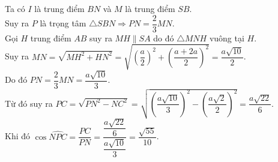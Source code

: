 \begin{ex}
{\begin{itemize}
			Ta  có $I$ là trung điểm $BN$ và $M$ là trung điểm $SB$.\\
			Suy ra $P$ là  trọng tâm $\triangle SBN\Rightarrow PN=\dfrac{2}{3}MN$.\\
			Gọi $H$ trung điểm $AB$ suy ra $MH\parallel  SA$ do đó $\triangle MNH$ vuông tại $H$.\\
			 Suy ra $MN=\sqrt{MH^2+HN^2}=\sqrt{\left(\dfrac{a}{2}\right)^2+\left(\dfrac{a+2a}{2}\right)^2}=\dfrac{a\sqrt{10}}{2}$.\\
			 Do đó $PN=\dfrac{2}{3}MN=\dfrac{a\sqrt{10}}{3}$.\\
			Từ đó suy ra $PC=\sqrt{PN^2-NC^2}=\sqrt{\left(\dfrac{a\sqrt{10}}{3}\right)^2-\left(\dfrac{a\sqrt  2}{2}\right)^2}=\dfrac{a\sqrt{22}}{6}$.\\
			Khi đó  $\cos\widehat{NPC}=\dfrac{PC}{PN}=\dfrac{\dfrac{a\sqrt{22}}{6}}{\dfrac{a\sqrt{10}}{3}}=\dfrac{\sqrt{55}}{10}$.
		\end{itemize}
	 }
\end{ex}

